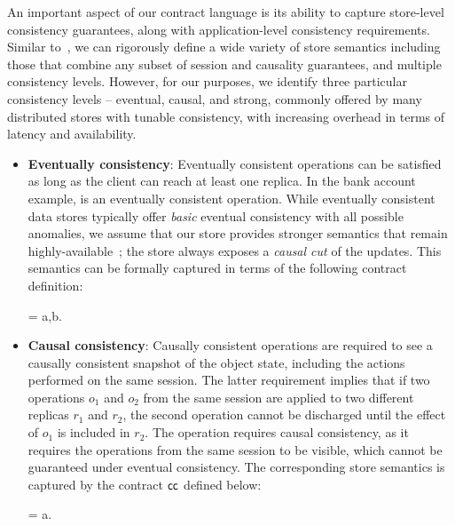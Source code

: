 An important aspect of our contract language is its ability to capture
store-level consistency guarantees, along with application-level consistency
requirements. Similar to~\cite{Burckhardt2014}, we can rigorously define a wide
variety of store semantics including those that combine any subset of session
and causality guarantees, and multiple consistency levels.  However, for our
purposes, we identify three particular consistency levels -- eventual, causal,
and strong, commonly offered by many distributed stores with tunable
consistency, with increasing overhead in terms of latency and availability.

\begin{itemize}
\setlength{\itemsep}{2pt}

\item \textbf{Eventually consistency}: Eventually consistent operations can
	be satisfied as long as the client can reach at least one replica. In the
	bank account example,  is an eventually consistent operation.
	While eventually consistent data stores typically offer \emph{basic} eventual
	consistency with all possible anomalies, we assume that our store provides
	stronger semantics that remain highly-available~\cite{BailisHAT,COPS}; the
	store always exposes a \emph{causal cut} of the updates. This semantics can
	be formally captured in terms of the following contract definition:

  \vspace{-1em}
  \begin{smathpar}
  \ecc = \forall a,b. ~ \wedge {} \Rightarrow {}
  \end{smathpar}

\item \textbf{Causal consistency}: Causally consistent operations are required
	to see a causally consistent snapshot of the object state, including the
	actions performed on the same session.  The latter requirement implies that
	if two operations $o_1$ and $o_2$ from the same session are applied to two
	different replicas $r_1$ and $r_2$, the second operation cannot be discharged
	until the effect of $o_1$ is included in $r_2$. The  operation
	requires causal consistency, as it requires the operations from the same
	session to be visible, which cannot be guaranteed under eventual consistency.
	The corresponding store semantics is captured by the contract ${\sf cc}$ defined
	below:

  \vspace{-1em}
  \begin{smathpar}
  \ccc = \forall a.~ \Rightarrow {}
  \end{smathpar}


\end{itemize}
